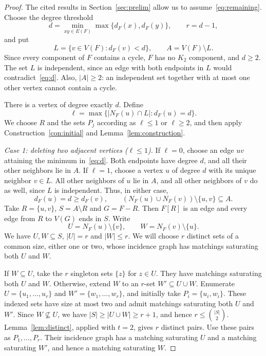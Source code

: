 \documentclass[10pt,a4paper]{article}
\numberwithin{equation}{section}
\theoremstyle{definition}
\theoremstyle{plain}
\begin{document}
\begin{proof}
The cited results in Section~\ref{sec:prelim} allow us to
assume~\eqref{eq:remaining}. Choose the degree threshold
\begin{equation}\label{eq:d}
 d=\min_{xy\in E(F)}\max\{d_F(x),d_F(y)\},\qquad r=d-1,
\end{equation}
and put
\[
 L=\{v\in V(F):d_F(v)<d\},\qquad A=V(F)\setminus L.
\]
Since every component of $F$ contains a cycle, $F$ has no $K_2$
component, and $d\ge2$. The set $L$ is independent, since an edge
with both endpoints in $L$ would contradict~\eqref{eq:d}.
Also, $|A|\ge2$: an independent set together with at most one other
vertex cannot contain a cycle.

There is a vertex of degree exactly $d$. Define
\[
 \ell=\max\{|N_F(u)\cap L|:d_F(u)=d\}.
\]
We choose $R$ and the sets $P_j$ according as $\ell\le1$ or
$\ell\ge2$, and then apply Construction~\ref{con:initial} and
Lemma~\ref{lem:construction}.

\smallskip
\noindent\textit{Case 1: deleting two adjacent vertices ($\ell\le1$).}
If $\ell=0$, choose an edge $uv$ attaining the minimum in~\eqref{eq:d}.
Both endpoints have degree $d$, and all their other neighbors lie in
$A$. If $\ell=1$, choose a vertex $u$ of degree $d$ with its unique
neighbor $v\in L$. All other neighbors of $u$ lie in $A$, and all
other neighbors of $v$ do as well, since $L$ is independent.
Thus, in either case,
\[
 d_F(u)=d\ge d_F(v),\qquad
 (N_F(u)\cup N_F(v))\setminus\{u,v\}\subseteq A.
\]
Take $R=\{u,v\}$, $S=A\setminus R$ and $G=F-R$.
Then $F[R]$ is an edge and every edge from $R$ to $V(G)$ ends in $S$.
Write
\[
 U=N_F(u)\setminus\{v\},\qquad W=N_F(v)\setminus\{u\}.
\]
We have $U,W\subseteq S$, $|U|=r$ and $|W|\le r$.
We will choose $r$ distinct sets of a common size, either one or two,
whose incidence graph has matchings saturating both $U$ and $W$.

If $W\subseteq U$, take the $r$ singleton sets $\{z\}$ for $z\in U$.
They have matchings saturating both $U$ and $W$.
Otherwise, extend $W$ to an $r$-set $W'\subseteq U\cup W$.
Enumerate $U=\{u_1,\ldots,u_r\}$ and $W'=\{w_1,\ldots,w_r\}$,
and initially take $P_i=\{u_i,w_i\}$. These indexed sets have size at
most two and admit matchings saturating both $U$ and $W'$.
Since $W\nsubseteq U$, we have $|S|\ge |U\cup W|\ge r+1$, and hence
$r\le\binom{|S|}{2}$. Lemma~\ref{lem:distinct}, applied with $t=2$,
gives $r$ distinct pairs. Use these pairs as $P_1,\ldots,P_r$.
Their incidence graph has a matching saturating $U$ and a matching
saturating $W'$, and hence a matching saturating $W$.


\end{proof}
\end{document}
